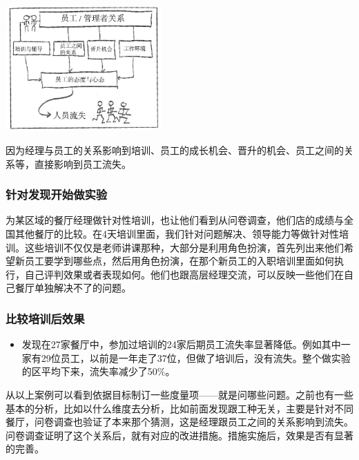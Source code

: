 \includegraphics[width=6cm]{WeisbordP2191.jpg}

因为经理与员工的关系影响到培训、员工的成长机会、晋升的机会、员工之间的关系等，直接影响到员工流失。

\hypertarget{ux9488ux5bf9ux53d1ux73b0ux5f00ux59cbux505aux5b9eux9a8c}{%
\subsubsection{针对发现开始做实验}\label{ux9488ux5bf9ux53d1ux73b0ux5f00ux59cbux505aux5b9eux9a8c}}

为某区域的餐厅经理做针对性培训，也让他们看到从问卷调查，他们店的成绩与全国其他餐厅的比较。在4天培训里面，我们针对问题解决、领导能力等做针对性培训。这些培训不仅仅是老师讲课那种，大部分是利用角色扮演，首先列出来他们希望新员工要学到哪些点，然后用角色扮演，在那个新员工的入职培训里面如何执行，自己评判效果或者表现如何。他们也跟高层经理交流，可以反映一些他们在自己餐厅单独解决不了的问题。

\hypertarget{ux6bd4ux8f83ux57f9ux8badux540eux6548ux679c}{%
\subsubsection{比较培训后效果}\label{ux6bd4ux8f83ux57f9ux8badux540eux6548ux679c}}

\begin{itemize}
\tightlist
\item
  发现在27家餐厅中，参加过培训的24家后期员工流失率显著降低。例如其中一家有29位员工，以前是一年走了37位，但做了培训后，没有流失。整个做实验的区平均下来，流失率减少了50\%。\\
\end{itemize}

从以上案例可以看到依据目标制订一些度量项------就是问哪些问题。之前也有一些基本的分析，比如以什么维度去分析，比如前面发现跟工种无关，主要是针对不同餐厅，问卷调查也验证了本来那个猜测，这是经理跟员工之间的关系影响到流失。问卷调查证明了这个关系后，就有对应的改进措施。措施实施后，效果是否有显著的完善。

